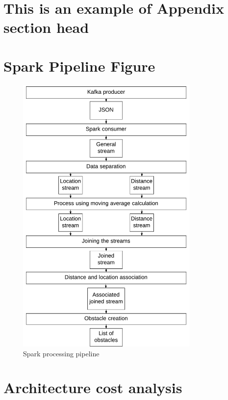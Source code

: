 \documentclass[prodmode,acmtosem]{acmsmall} %
\begin{document}




\elecappendix

\medskip

\section{This is an example of Appendix section head}

\pagebreak
\section{Spark Pipeline Figure}
\label{app:SparkPipeline}
\begin{figure}[!ht]
\label{fig:SparkPipeline}
\centering
\includegraphics[width=0.8\textwidth]{SparkPipeline.pdf}
\caption{Spark processing pipeline}
\end{figure}
\clearpage
\pagebreak
\section{Architecture cost analysis}
\label{ArchitectureCost}
\end{document}
